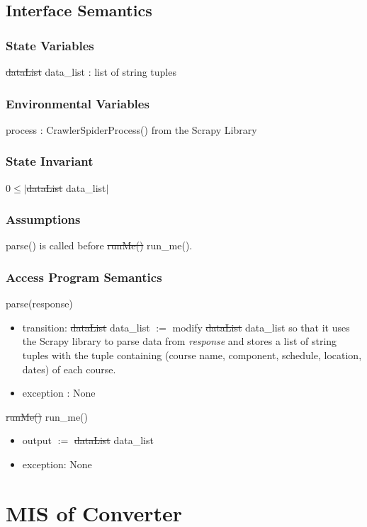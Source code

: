 \documentclass[12pt, titlepage]{article}
\begin{document}
\subsection{Interface Semantics}
\subsubsection{State Variables}
\sout{dataList} \color{blue}data\_list\color{black} : list of string tuples
\subsubsection{Environmental Variables}
process : CrawlerSpiderProcess() from the Scrapy Library %
\subsubsection{State Invariant}
$0 \le |$\sout{dataList} \color{blue}data\_list\color{black}$|$
\subsubsection{Assumptions}
parse() is called before \sout{runMe()} \color{blue}run\_me()\color{black}.
\subsubsection{Access Program Semantics}
parse(response)
\begin{itemize}
    \item transition: \sout{dataList} \color{blue}data\_list\color{black} $:= $ modify \sout{dataList} \color{blue}data\_list \color{black} so that it uses the Scrapy library to parse data from \emph{response} and stores a list of string tuples with the tuple containing (course name, component, schedule, location, dates) of each course.
    \item exception : None
\end{itemize}
\sout{runMe()} \color{blue}run\_me()\color{black}
\begin{itemize}
    \item output $:= $ \sout{dataList} \color{blue}data\_list\color{black} 
    \item exception: None
\end{itemize}

\newpage

\section{MIS of Converter} \label{SecM1}
\end{document}
